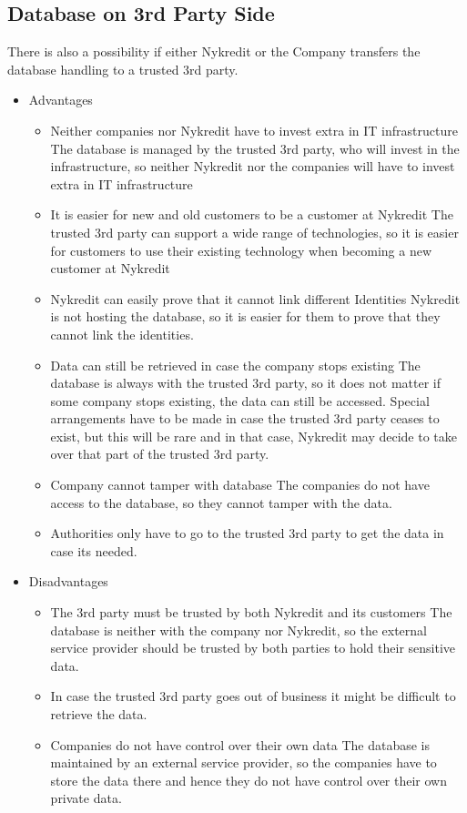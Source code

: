 \subsection{Database on 3rd Party Side}
There is also a possibility if either Nykredit or the Company transfers the database handling to a trusted 3rd party.
\begin{itemize}
\item Advantages
\begin{itemize}
\item Neither companies nor Nykredit have to invest extra in IT infrastructure
The database is managed by the trusted 3rd party, who will invest in the infrastructure, so neither Nykredit nor the companies will have to invest extra in IT infrastructure
\item It is easier for new and old customers to be a customer at Nykredit
The trusted 3rd party can support a wide range of technologies, so it is easier for customers to use their existing technology when becoming a new customer at Nykredit
\item Nykredit can easily prove that it cannot link different Identities
Nykredit is not hosting the database, so it is easier for them to prove that they cannot link the identities.
\item Data can still be retrieved in case the company stops existing 
The database is always with the trusted 3rd party, so it does not matter if some company stops existing, the data can still be accessed. Special arrangements have to be made in case the trusted 3rd party ceases to exist, but this will be rare and in that case, Nykredit may decide to take over that part of the trusted 3rd party.
\item Company cannot tamper with database
The companies do not have access to the database, so they cannot tamper with the data.
\item Authorities only have to go to the trusted 3rd party to get the data
 in case its needed.
\end{itemize}
\end{itemize}
\begin{itemize}
\item Disadvantages
\begin{itemize}
\item The 3rd party must be trusted by both Nykredit and its customers
The database is neither with the company nor Nykredit, so the external service provider should be trusted by both parties to hold their sensitive data.
\item In case the trusted 3rd party goes out of business it might be difficult to retrieve the data.
\item Companies do not have control over their own data
The database is maintained by an external service provider, so the companies have to store the data there and hence they do not have control over their own private data.

\end{itemize}
\end{itemize}
